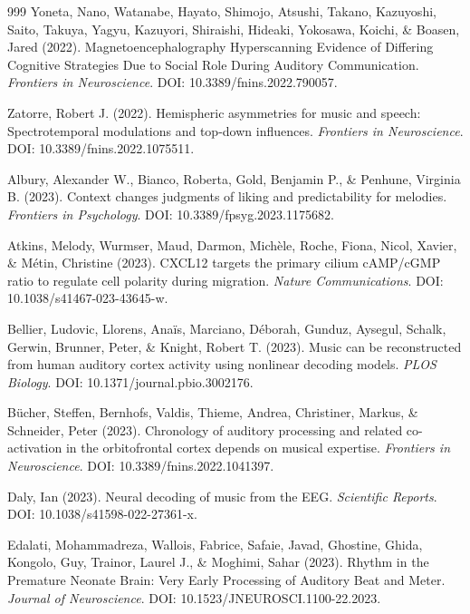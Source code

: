 \documentclass[9pt,onecolumn]{article}
\begin{document}
\begin{thebibliography}{999}
Yoneta, Nano, Watanabe, Hayato, Shimojo, Atsushi, Takano, Kazuyoshi, Saito, Takuya, Yagyu, Kazuyori, Shiraishi, Hideaki, Yokosawa, Koichi, \& Boasen, Jared (2022). Magnetoencephalography Hyperscanning Evidence of Differing Cognitive Strategies Due to Social Role During Auditory Communication. \textit{Frontiers in Neuroscience}. DOI: 10.3389/fnins.2022.790057.

Zatorre, Robert J. (2022). Hemispheric asymmetries for music and speech: Spectrotemporal modulations and top-down influences. \textit{Frontiers in Neuroscience}. DOI: 10.3389/fnins.2022.1075511.

Albury, Alexander W., Bianco, Roberta, Gold, Benjamin P., \& Penhune, Virginia B. (2023). Context changes judgments of liking and predictability for melodies. \textit{Frontiers in Psychology}. DOI: 10.3389/fpsyg.2023.1175682.

Atkins, Melody, Wurmser, Maud, Darmon, Michèle, Roche, Fiona, Nicol, Xavier, \& Métin, Christine (2023). CXCL12 targets the primary cilium cAMP/cGMP ratio to regulate cell polarity during migration. \textit{Nature Communications}. DOI: 10.1038/s41467-023-43645-w.

Bellier, Ludovic, Llorens, Anaïs, Marciano, Déborah, Gunduz, Aysegul, Schalk, Gerwin, Brunner, Peter, \& Knight, Robert T. (2023). Music can be reconstructed from human auditory cortex activity using nonlinear decoding models. \textit{PLOS Biology}. DOI: 10.1371/journal.pbio.3002176.

Bücher, Steffen, Bernhofs, Valdis, Thieme, Andrea, Christiner, Markus, \& Schneider, Peter (2023). Chronology of auditory processing and related co-activation in the orbitofrontal cortex depends on musical expertise. \textit{Frontiers in Neuroscience}. DOI: 10.3389/fnins.2022.1041397.

Daly, Ian (2023). Neural decoding of music from the EEG. \textit{Scientific Reports}. DOI: 10.1038/s41598-022-27361-x.

Edalati, Mohammadreza, Wallois, Fabrice, Safaie, Javad, Ghostine, Ghida, Kongolo, Guy, Trainor, Laurel J., \& Moghimi, Sahar (2023). Rhythm in the Premature Neonate Brain: Very Early Processing of Auditory Beat and Meter. \textit{Journal of Neuroscience}. DOI: 10.1523/JNEUROSCI.1100-22.2023.


\end{thebibliography}
\end{document}
